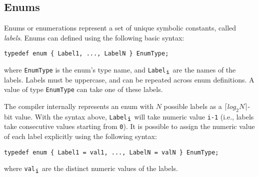 \subsection{Enums}
\label{sec:enums}

Enums or enumerations represent a set of unique symbolic constants, called \emph{labels}.
Enums can defined using the following basic syntax:
\begin{center}
  \verb|typedef enum { Label1, ..., LabelN } EnumType;|
\end{center}
where \verb|EnumType| is the enum's type name, and \verb|Label|$_{\verb|i|}$ are the names of the labels.
Labels must be uppercase, and can be repeated across enum definitions.
A value of type \verb|EnumType| can take one of these labels.

The compiler internally represents an enum with $N$ possible labels as a $\lceil log_2N \rceil$-bit value.
With the syntax above, \verb|Label|$_{\verb|i|}$ will take numeric value \verb|i-1| (i.e., labels take consecutive values starting from \verb|0|).
It is possible to assign the numeric value of each label explicitly using the following syntax:
\begin{center}
  \verb|typedef enum { Label1 = val1, ..., LabelN = valN } EnumType;|
\end{center}
where \verb|val|$_{\verb|i|}$ are the distinct numeric values of the labels.
